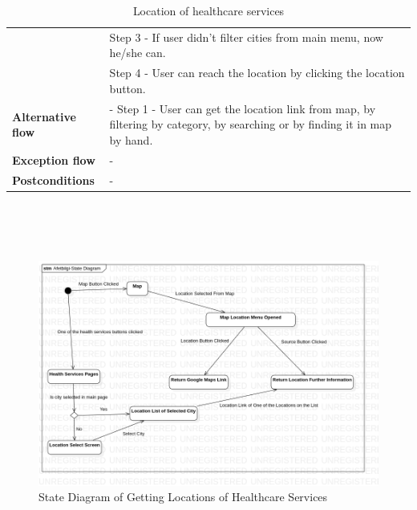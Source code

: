 \begin{center}
\begin{table}[H]
\begin{tabular}{| m{3cm}| m{10cm} |}
                                      & Step 3 - If user didn't filter cities from main menu, now he/she can.                                                                                                \\
                                      & Step 4 - User can reach the location by clicking the location button.                                                                                                \\
            \hline
            \textbf{Alternative flow} & - Step 1 - User can get the location link from map, by filtering by category, by searching or by finding it in map by hand.                                          \\
            \hline
            \textbf{Exception flow}   & -                                                                                                                                                                    \\
            \hline
            \textbf{Postconditions}   & -                                                                                                                                                                    \\
            \hline
        \end{tabular}
        \caption[Location of healthcare services]{Location of healthcare services}
    \end{table}
    ~\\~\\~\\
    \begin{figure}[H]
        \begin{center}
            \includegraphics[scale = 0.5]{assets/StateDiagram.png}
            \caption[State Diagram of Getting Locations of Healthcare Services]{State Diagram of Getting Locations of Healthcare Services}
        \end{center}
    \end{figure}


\end{center}
